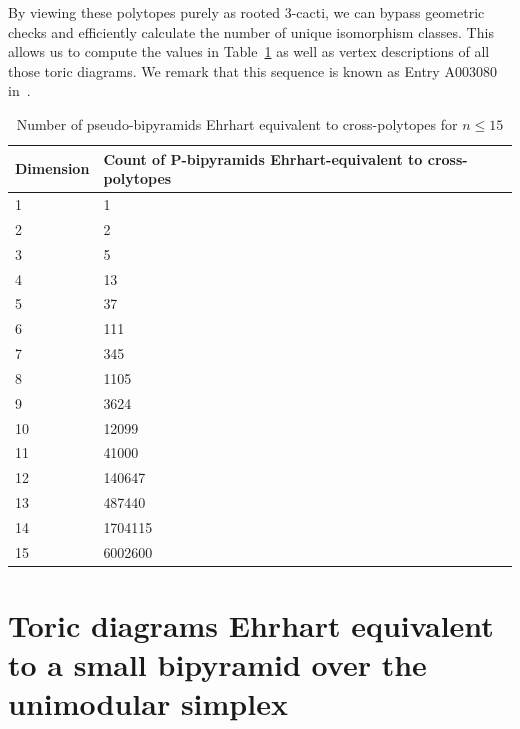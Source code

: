 \documentclass[a4paper,11pt,reqno]{amsart}
\begin{document}
By viewing these polytopes purely as rooted $3$-cacti, we can bypass geometric checks and efficiently 
calculate the number of unique isomorphism classes. This allows us to compute the values in 
Table~\ref{table:resultados} as well as vertex descriptions of all those toric diagrams. We remark 
that this sequence is known as Entry A003080 in~\cite{OEIS}.
	
	\begin{table}[H]
		\centering
		\begin{tabular}{||p{5cm} p{5cm}||} 
			\hline
			Dimension & Count of P-bipyramids Ehrhart-equivalent to cross-polytopes \\ [0.5ex] 
			\hline\hline
			1 & 1  \\ 
			2 & 2 \\
			3 & 5 \\
			4 & 13 \\
			5 & 37 \\
			6 & 111 \\
			7 & 345 \\
			8 & 1105 \\
			9 & 3624 \\
			10 & 12099 \\
			11 & 41000 \\
			12 & 140647 \\
			13 & 487440 \\
			14 & 1704115 \\ 
			15 & 6002600 \\ [1ex] 
			\hline
		\end{tabular}
		\caption{Number of pseudo-bipyramids Ehrhart equivalent to cross-polytopes for $n \leq 15$}
		\label{table:resultados}
	\end{table}


\section{Toric diagrams Ehrhart equivalent to a small bipyramid over the unimodular simplex} \label{sec:bipysimplex}
\end{document}
